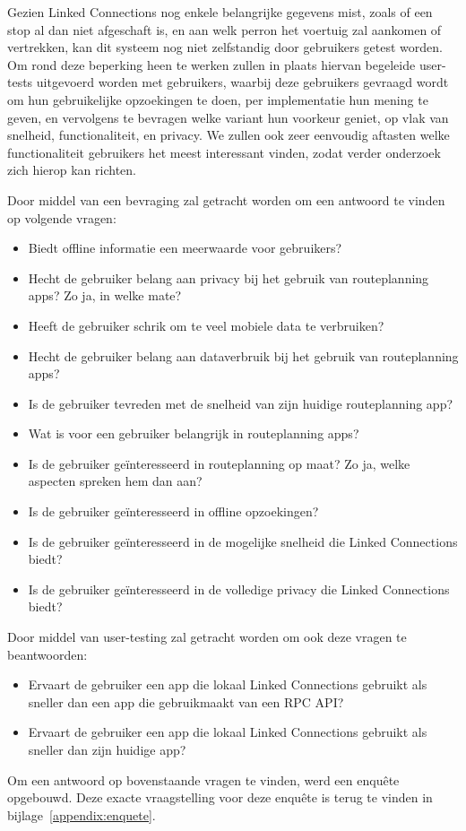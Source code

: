 Gezien Linked Connections nog enkele belangrijke gegevens mist, zoals of een stop al dan niet afgeschaft is, en aan welk perron het voertuig zal aankomen of vertrekken, kan dit systeem nog niet zelfstandig door gebruikers getest worden. Om rond deze beperking heen te werken zullen in plaats hiervan begeleide user-tests uitgevoerd worden met gebruikers, waarbij deze gebruikers gevraagd wordt om hun gebruikelijke opzoekingen te doen, per implementatie hun mening te geven, en vervolgens te bevragen welke variant hun voorkeur geniet, op vlak van snelheid, functionaliteit, en privacy.
We zullen ook zeer eenvoudig aftasten welke functionaliteit gebruikers het meest interessant vinden, zodat verder onderzoek zich hierop kan richten.

Door middel van een bevraging zal getracht worden om een antwoord te vinden op volgende vragen:
\begin{itemize}
	\item Biedt offline informatie een meerwaarde voor gebruikers?
	\item Hecht de gebruiker belang aan privacy bij het gebruik van routeplanning apps? Zo ja, in welke mate?
	\item Heeft de gebruiker schrik om te veel mobiele data te verbruiken?
	\item Hecht de gebruiker belang aan dataverbruik bij het gebruik van routeplanning apps?
	\item Is de gebruiker tevreden met de snelheid van zijn huidige routeplanning app?
	\item Wat is voor een gebruiker belangrijk in routeplanning apps?
	\item Is de gebruiker geïnteresseerd in routeplanning op maat? Zo ja, welke aspecten spreken hem dan aan?
	\item Is de gebruiker geïnteresseerd in offline opzoekingen?
	\item Is de gebruiker geïnteresseerd in de mogelijke snelheid die Linked Connections biedt?
	\item Is de gebruiker geïnteresseerd in de volledige privacy die Linked Connections biedt?
\end{itemize}

Door middel van user-testing zal getracht worden om ook deze vragen te beantwoorden:
\begin{itemize}
	\item Ervaart de gebruiker een app die lokaal Linked Connections gebruikt als sneller dan een app die gebruikmaakt van een RPC API?
	\item Ervaart de gebruiker een app die lokaal Linked Connections gebruikt als sneller dan zijn huidige app?
\end{itemize}

Om een antwoord op bovenstaande vragen te vinden, werd een enquête opgebouwd. Deze exacte vraagstelling voor deze enquête is terug te vinden in bijlage~\ref{appendix:enquete}.